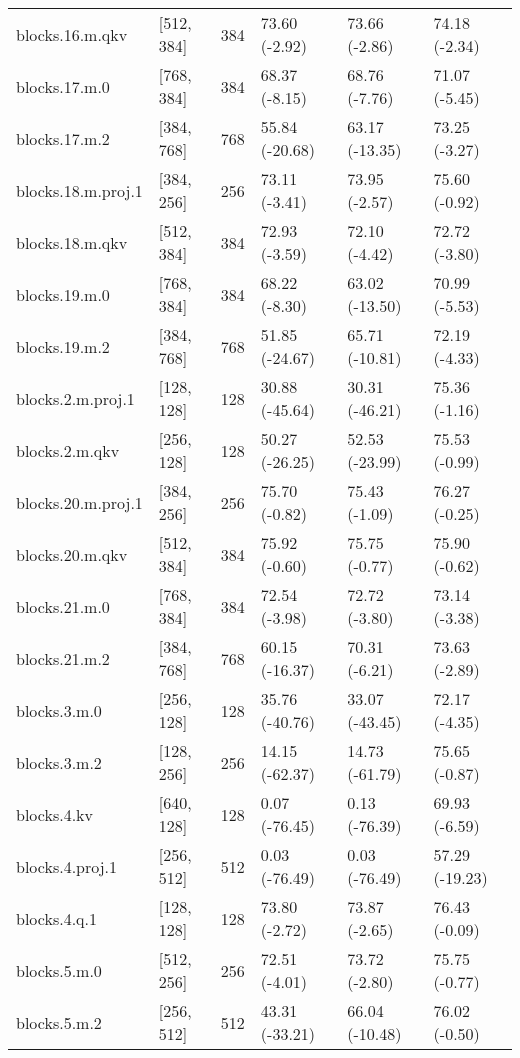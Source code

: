 \begin{tabular}{llrlll}
   blocks.16.m.qkv &  [512, 384] &  384 &  73.60 (-2.92) &  73.66 (-2.86) &  74.18 (-2.34) \\
     blocks.17.m.0 &  [768, 384] &  384 &  68.37 (-8.15) &  68.76 (-7.76) &  71.07 (-5.45) \\
     blocks.17.m.2 &  [384, 768] &  768 & 55.84 (-20.68) & 63.17 (-13.35) &  73.25 (-3.27) \\
blocks.18.m.proj.1 &  [384, 256] &  256 &  73.11 (-3.41) &  73.95 (-2.57) &  75.60 (-0.92) \\
   blocks.18.m.qkv &  [512, 384] &  384 &  72.93 (-3.59) &  72.10 (-4.42) &  72.72 (-3.80) \\
     blocks.19.m.0 &  [768, 384] &  384 &  68.22 (-8.30) & 63.02 (-13.50) &  70.99 (-5.53) \\
     blocks.19.m.2 &  [384, 768] &  768 & 51.85 (-24.67) & 65.71 (-10.81) &  72.19 (-4.33) \\
 blocks.2.m.proj.1 &  [128, 128] &  128 & 30.88 (-45.64) & 30.31 (-46.21) &  75.36 (-1.16) \\
    blocks.2.m.qkv &  [256, 128] &  128 & 50.27 (-26.25) & 52.53 (-23.99) &  75.53 (-0.99) \\
blocks.20.m.proj.1 &  [384, 256] &  256 &  75.70 (-0.82) &  75.43 (-1.09) &  76.27 (-0.25) \\
   blocks.20.m.qkv &  [512, 384] &  384 &  75.92 (-0.60) &  75.75 (-0.77) &  75.90 (-0.62) \\
     blocks.21.m.0 &  [768, 384] &  384 &  72.54 (-3.98) &  72.72 (-3.80) &  73.14 (-3.38) \\
     blocks.21.m.2 &  [384, 768] &  768 & 60.15 (-16.37) &  70.31 (-6.21) &  73.63 (-2.89) \\
      blocks.3.m.0 &  [256, 128] &  128 & 35.76 (-40.76) & 33.07 (-43.45) &  72.17 (-4.35) \\
      blocks.3.m.2 &  [128, 256] &  256 & 14.15 (-62.37) & 14.73 (-61.79) &  75.65 (-0.87) \\
       blocks.4.kv &  [640, 128] &  128 &  0.07 (-76.45) &  0.13 (-76.39) &  69.93 (-6.59) \\
   blocks.4.proj.1 &  [256, 512] &  512 &  0.03 (-76.49) &  0.03 (-76.49) & 57.29 (-19.23) \\
      blocks.4.q.1 &  [128, 128] &  128 &  73.80 (-2.72) &  73.87 (-2.65) &  76.43 (-0.09) \\
      blocks.5.m.0 &  [512, 256] &  256 &  72.51 (-4.01) &  73.72 (-2.80) &  75.75 (-0.77) \\
      blocks.5.m.2 &  [256, 512] &  512 & 43.31 (-33.21) & 66.04 (-10.48) &  76.02 (-0.50) \\

\end{tabular}
